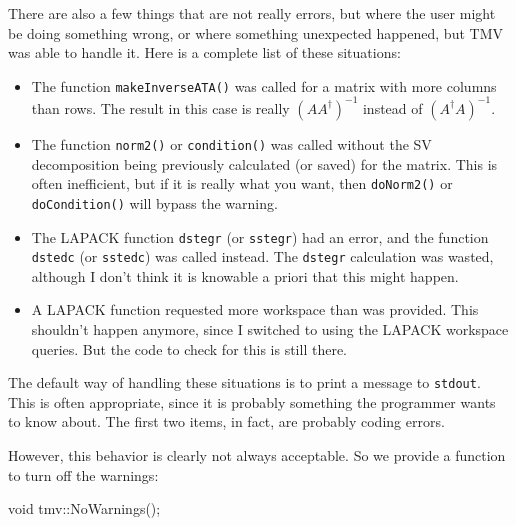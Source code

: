 \documentclass[twoside,letterpaper,11pt]{article}
\renewcommand{\tt}[1]{{\lstinline {#1}}}
\begin{document}
There are also a few things that are not really errors, but where the user might be doing
something wrong, or where something unexpected happened, but TMV was able to handle it.
Here is a complete list of these situations:
\begin{itemize}
\item The function \tt{makeInverseATA()} was called for a matrix with more columns than rows.
The result in this case is really $(AA^\dagger)^{-1}$ instead of $(A^\dagger A)^{-1}$.
\item The function \tt{norm2()} or \tt{condition()} was called without the SV decomposition
being previously calculated (or saved) for the matrix.  This is often inefficient, but if it is really what you
want, then \tt{doNorm2()} or \tt{doCondition()} will bypass the warning.
\item The LAPACK function \tt{dstegr} (or \tt{sstegr}) had an error, and the function
\tt{dstedc} (or \tt{sstedc}) was called instead.  The \tt{dstegr} calculation was wasted,
although I don't think it is knowable a priori that this might happen.
\item A LAPACK function requested more workspace than was provided.  This shouldn't happen
anymore, since I switched to using the LAPACK workspace queries.  But the code to check
for this is still there.
\end{itemize}

The default way of handling these situations is to print a message to \tt{stdout}.  This is often
appropriate, since it is probably something the programmer wants to know about.
The first two items, in fact, are probably coding errors.

However, this behavior is clearly not always acceptable.  So we provide a function to 
turn off the warnings:
\begin{tmvcode}
void tmv::NoWarnings();
\end{tmvcode}
\end{document}
